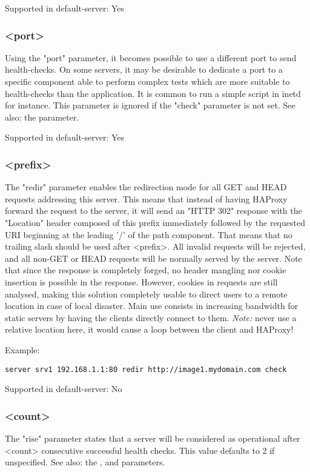   Supported in default-server: Yes

\subsubsection[port]{ <port>}
  Using the "port" parameter, it becomes possible to use a different port to
  send health-checks. On some servers, it may be desirable to dedicate a port
  to a specific component able to perform complex tests which are more suitable
  to health-checks than the application. It is common to run a simple script in
  inetd for instance. This parameter is ignored if the "check" parameter is not
  set. See also: the  parameter.

  Supported in default-server: Yes

\subsubsection[redir]{ <prefix>}
  The "redir" parameter enables the redirection mode for all GET and HEAD
  requests addressing this server. This means that instead of having HAProxy
  forward the request to the server, it will send an "HTTP 302" response with
  the "Location" header composed of this prefix immediately followed by the
  requested URI beginning at the leading '/' of the path component. That means
  that no trailing slash should be used after <prefix>. All invalid requests
  will be rejected, and all non-GET or HEAD requests will be normally served by
  the server. Note that since the response is completely forged, no header
  mangling nor cookie insertion is possible in the response. However, cookies in
  requests are still analysed, making this solution completely usable to direct
  users to a remote location in case of local disaster. Main use consists in
  increasing bandwidth for static servers by having the clients directly
  connect to them. \emph{Note:} never use a relative location here, it would cause a
  loop between the client and HAProxy!

  Example:
  
  \verb|server srv1 192.168.1.1:80 redir http://image1.mydomain.com check|

  Supported in default-server: No

\subsubsection[rise]{ <count>}
  The "rise" parameter states that a server will be considered as operational
  after <count> consecutive successful health checks. This value defaults to 2
  if unspecified. See also: the ,  and  parameters.

